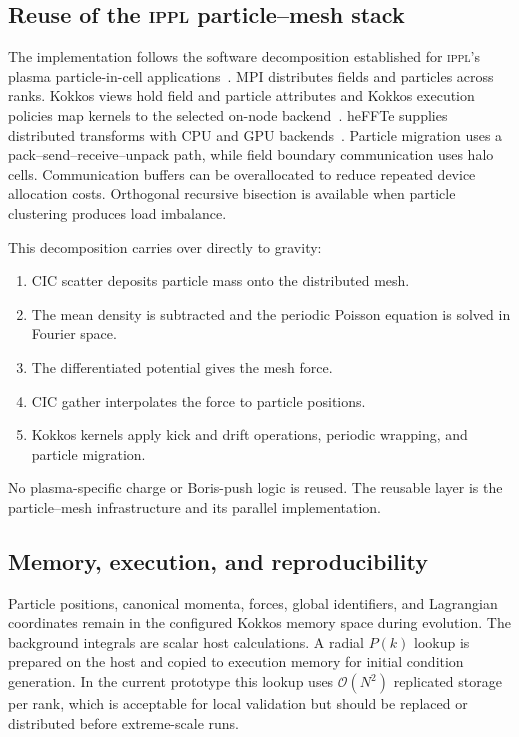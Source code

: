 \documentclass[11pt]{article}
\newcommand{\IPPL}{\textnormal{\textsc{ippl}}\xspace}
\begin{document}
\subsection{Reuse of the \IPPL particle--mesh stack}

The implementation follows the software decomposition established for \IPPL's
plasma particle-in-cell applications~\cite{muralikrishnan2024scaling}.  MPI
distributes fields and particles across ranks.  Kokkos views hold field and
particle attributes and Kokkos execution policies map kernels to the selected
on-node backend~\cite{trott2022kokkos}.  heFFTe supplies distributed transforms
with CPU and GPU backends~\cite{ayala2020heffte}.  Particle migration uses a
pack--send--receive--unpack path, while field boundary communication uses halo
cells.  Communication buffers can be overallocated to reduce repeated device
allocation costs.  Orthogonal recursive bisection is available when particle
clustering produces load imbalance.

This decomposition carries over directly to gravity:
\begin{enumerate}
  \item CIC scatter deposits particle mass onto the distributed mesh.
  \item The mean density is subtracted and the periodic Poisson equation is
        solved in Fourier space.
  \item The differentiated potential gives the mesh force.
  \item CIC gather interpolates the force to particle positions.
  \item Kokkos kernels apply kick and drift operations, periodic wrapping, and
        particle migration.
\end{enumerate}
No plasma-specific charge or Boris-push logic is reused.  The reusable layer is
the particle--mesh infrastructure and its parallel implementation.

\subsection{Memory, execution, and reproducibility}

Particle positions, canonical momenta, forces, global identifiers, and
Lagrangian coordinates remain in the configured Kokkos memory space during
evolution.  The background integrals are scalar host calculations.  A radial
$P(k)$ lookup is prepared on the host and copied to execution memory for initial
condition generation.  In the current prototype this lookup uses
$\mathcal{O}(N^2)$ replicated storage per rank, which is acceptable for local
validation but should be replaced or distributed before extreme-scale runs.
\end{document}
